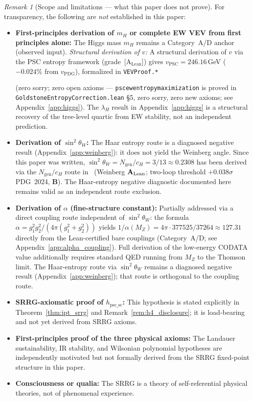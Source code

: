 \documentclass[11pt]{article}
\theoremstyle{remark}
\newtheorem{remark}[theorem]{Remark}
\newcommand{\CatAL}{\ensuremath{\textbf{A}_{\rm Lean}}}
\newcommand{\CatB}{\textbf{B}}
\newcommand{\lean}[1]{%
  \penalty-100
  \begingroup
  \def\_{\textunderscore\allowbreak}%
  \texttt{#1}%
  \endgroup
}
\begin{document}
\begin{remark}[Scope and limitations --- what this paper does not prove]
\label{rem:scope}
For transparency, the following are \emph{not} established in this paper:
\begin{itemize}[leftmargin=2.5em]
  \item \textbf{First-principles derivation of $m_H$ or complete EW VEV
    from first principles alone:}
    The Higgs mass $m_H$ remains a Category~A/D anchor (observed input).
    \emph{Structural derivation of $v$:} A structural derivation of $v$ via the PSC
    entropy framework (grade~[A$_{\mathrm{Lean}}$]) gives $v_{\mathrm{PSC}} = 246.16$\,GeV
    ($-0.024\%$ from $v_{\mathrm{PDG}}$), formalized in \lean{VEVProof.*}
    (zero sorry; zero open axioms --- \lean{psc\_ew\_entropy\_maximization} is
    proved in \lean{GoldstoneEntropyCorrection.lean} \S5, zero sorry, zero new axioms;
    see Appendix~\ref{app:higgs}).
    The $\lambda_H$ result in Appendix~\ref{app:higgs} is a structural recovery
    of the tree-level quartic from EW stability, not an independent prediction.
  \item \textbf{Derivation of $\sin^2\theta_W$:} The Haar entropy route is a diagnosed negative
    result (Appendix~\ref{app:weinberg}): it does not yield the Weinberg angle.
    Since this paper was written, $\sin^2\theta_W = N_{\mathrm{gen}}/c_H = 3/13 \approx 0.2308$ has been derived via the $N_{\mathrm{gen}}/c_H$ route in~\cite{SpivackWeinberg} (Weinberg \CatAL; two-loop threshold $+0.038\sigma$ PDG~2024, \CatB). The Haar-entropy negative diagnostic documented here remains valid as an independent route exclusion.
  \item \textbf{Derivation of $\alpha$ (fine-structure constant):} Partially
    addressed via a direct coupling route independent of $\sin^2\theta_W$:
    the formula $\alpha = g_1^2 g_2^2/(4\pi(g_1^2+g_2^2))$ yields
    $1/\alpha(M_Z) = 4\pi \cdot 377525/37264 \approx 127.31$ directly from the
    Lean-certified bare couplings (Category~A/D; see Appendix~\ref{app:alpha_coupling}).
    Full derivation of the low-energy CODATA value additionally requires standard
    QED running from $M_Z$ to the Thomson limit.
    The Haar-entropy route via $\sin^2\theta_W$ remains a diagnosed negative result
    (Appendix~\ref{app:weinberg}); that route is orthogonal to the coupling route.
  \item \textbf{SRRG-axiomatic proof of $h_{\mathrm{psc\_sc}}$:} This
    hypothesis is stated explicitly in Theorem~\ref{thm:ipt_srrg} and
    Remark~\ref{rem:h4_disclosure}; it is load-bearing and not yet derived
    from SRRG axioms.
  \item \textbf{First-principles proof of the three physical axioms:} The
    Landauer sustainability, IR stability, and Wilsonian polynomial hypotheses
    are independently motivated but not formally derived from the SRRG
    fixed-point structure in this paper.
  \item \textbf{Consciousness or qualia:} The SRRG is a theory of
    self-referential physical theories, not of phenomenal experience.
\end{itemize}
\end{remark}
\end{document}
